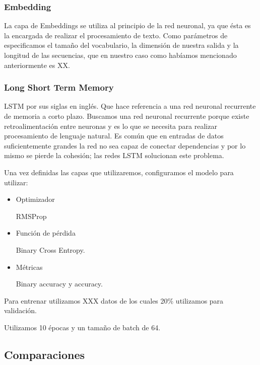 \documentclass[sigconf, nonacm, spanish]{acmart}
\begin{document}
\subsubsection{Embedding} 

La capa de Embeddings se utiliza al principio de la red neuronal, ya que ésta es la encargada de realizar el procesamiento de texto. Como parámetros de especificamos el tamaño del vocabulario, la dimensión de nuestra salida y la longitud de las secuencias, que en nuestro caso como habíamos mencionado anteriormente es XX.

\subsubsection{Long Short Term Memory}

LSTM por sus siglas en inglés. Que hace referencia a una red neuronal recurrente de memoria a corto plazo. Buscamos una red neuronal recurrente porque existe retroalimentación entre neuronas y es lo que se necesita para realizar procesamiento de lenguaje natural. Es común que en entradas de datos suficientemente grandes la red no sea capaz de conectar dependencias y por lo mismo se pierde la cohesión; las redes LSTM solucionan este problema.

Una vez definidas las capas que utilizaremos, configuramos el modelo para utilizar:

\begin{itemize}
    \item Optimizador
    
    RMSProp
    
    \item Función de pérdida
    
    Binary Cross Entropy.
    
    \item Métricas
    
    Binary accuracy y accuracy.
    
\end{itemize}

Para entrenar utilizamos XXX datos de los cuales 20\% utilizamos para validación.

Utilizamos 10 épocas y un tamaño de batch de 64.

\subsection{Comparaciones}
\end{document}
